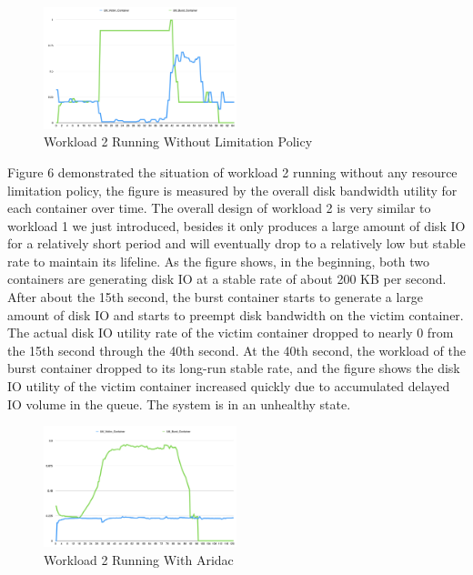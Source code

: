\documentclass[10pt, conference,compsoc]{IEEEtran}
\begin{document}
\begin{figure}[h]
\centering
\includegraphics[width=0.5\textwidth]{images/workload2_1.png}
\caption{Workload 2 Running Without Limitation Policy}
\end{figure}


Figure 6 demonstrated the situation of workload 2 running without any resource limitation policy, the figure is measured by the overall disk bandwidth utility for each container over time. The overall design of workload 2 is very similar to workload 1 we just introduced, besides it only produces a large amount of disk IO for a relatively short period and will eventually drop to a relatively low but stable rate to maintain its lifeline. As the figure shows, in the beginning, both two containers are generating disk IO at a stable rate of about 200 KB per second. After about the 15th second, the burst container starts to generate a large amount of disk IO and starts to preempt disk bandwidth on the victim container. The actual disk IO utility rate of the victim container dropped to nearly 0 from the 15th second through the 40th second. At the 40th second, the workload of the burst container dropped to its long-run stable rate, and the figure shows the disk IO utility of the victim container increased quickly due to accumulated delayed IO volume in the queue. The system is in an unhealthy state.\\

\begin{figure}[h]
\centering
\includegraphics[width=0.5\textwidth]{images/workload2_2.png}
\caption{Workload 2 Running With Aridac}
\end{figure}
\end{document}
